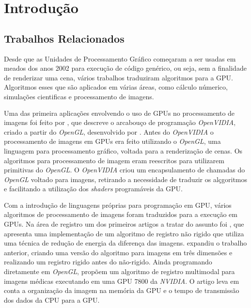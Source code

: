\chapter{Introdução}
\label{cap:introducao}


\section{Trabalhos Relacionados}
\label{sec:objetivo}
	Desde que as Unidades de Processamento Gráfico começaram a ser usadas em meados dos anos 2002 para execução de 
código genérico, ou seja, sem a finalidade de renderizar uma cena, vários trabalhos traduziram algoritmos para a GPU.
Algoritmos esses que são aplicados em várias áreas, como cálculo númerico, simulações cientificas e processamento de 
imagens.

	Uma das primeira aplicações envolvendo o uso de GPUs no processamento de imagens foi feito por 
\cite{fung2005openvidia}, que descreve o arcabouço de programação \textit{OpenVIDIA}, criado a partir do 
\textit{OpenGL}, desenvolvido por \cite{opengl}. Antes do \textit{OpenVIDIA} o processamento de imagens em GPUs era
feito utilizando o \textit{OpenGL}, uma linguagem para processamento gráfico, voltada para a renderização de cenas. Os
algoritmos para processamento de imagem eram reescritos para utilizarem primitivas do \textit{OpenGL}. O 
\textit{OpenVIDIA} criou um encapsulamento de chamadas do \textit{OpenGL} voltado para imagens, retirando a necessidade
de traduzir os alçgoritmos e facilitando a utilização dos \textit{shaders} programáveis da GPU.

	Com a introdução de linguagens próprias para programação em GPU, vários algoritmos de processamento de imagens foram
traduzidos para a execução em GPUs. Na área de registro um dos primeiros artigos a tratar do assunto foi 
\cite{strzodka2004image}, que apresenta uma implementação de um algoritmo de registro não rigido que utiliza uma técnica
de redução de energia da diferença das imagens. \cite{kohn2006gpu} expandiu o trabalho anterior, criando uma versão do 
algoritmo para imagens em três dimensões e realizando um registro rigido antes do não-rigido. Ainda programando 
diretamente em \textit{OpenGL}, \cite{vetter2007non} propõem um algoritmo de registro multimodal para imagens médicas 
executando em uma GPU 7800 da \textit{NVIDIA}. O artigo leva em conta a organização da imagem na memória da GPU e o 
tempo de transmissão dos dados da CPU para a GPU.

